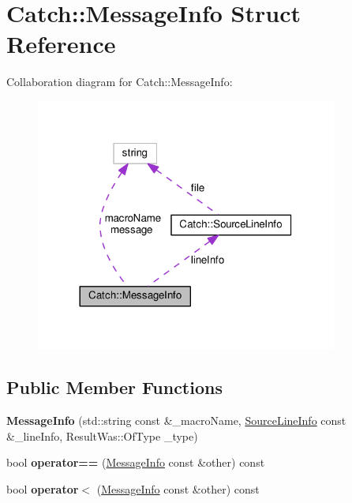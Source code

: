 \hypertarget{structCatch_1_1MessageInfo}{}\section{Catch\+:\+:Message\+Info Struct Reference}
\label{structCatch_1_1MessageInfo}


Collaboration diagram for Catch\+:\+:Message\+Info\+:
\nopagebreak
\begin{figure}[H]
\begin{center}
\leavevmode
\includegraphics[width=281pt]{structCatch_1_1MessageInfo__coll__graph}
\end{center}
\end{figure}
\subsection*{Public Member Functions}
\begin{DoxyCompactItemize}
\item 
{\bfseries Message\+Info} (std\+::string const \&\+\_\+macro\+Name, \hyperlink{structCatch_1_1SourceLineInfo}{Source\+Line\+Info} const \&\+\_\+line\+Info, Result\+Was\+::\+Of\+Type \+\_\+type)\hypertarget{structCatch_1_1MessageInfo_a2e336c33ebef7af3c1bbae6a56e14f8a}{}\label{structCatch_1_1MessageInfo_a2e336c33ebef7af3c1bbae6a56e14f8a}

\item 
bool {\bfseries operator==} (\hyperlink{structCatch_1_1MessageInfo}{Message\+Info} const \&other) const \hypertarget{structCatch_1_1MessageInfo_a30fe117138e568c5a9dfdabb7de6e790}{}\label{structCatch_1_1MessageInfo_a30fe117138e568c5a9dfdabb7de6e790}

\item 
bool {\bfseries operator$<$} (\hyperlink{structCatch_1_1MessageInfo}{Message\+Info} const \&other) const \hypertarget{structCatch_1_1MessageInfo_a7a2b1ec3772cd35176e2ee25a94be16a}{}\label{structCatch_1_1MessageInfo_a7a2b1ec3772cd35176e2ee25a94be16a}

\end{DoxyCompactItemize}
